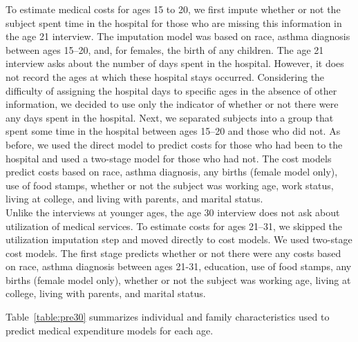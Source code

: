 \noindent To estimate medical costs for ages 15 to 20, we first impute whether or not the subject spent time in the hospital for those who are missing this information in the age 21 interview.  The imputation model was based on race, asthma diagnosis between ages 15--20, and, for females, the birth of any children.  The age 21 interview asks about the number of days spent in the hospital.  However, it does not record the ages at which these hospital stays occurred.  Considering the difficulty of assigning the hospital days to specific ages in the absence of other information, we decided to use only the indicator of whether or not there were any days spent in the hospital.  Next, we separated subjects into a group that spent some time in the hospital between ages 15--20 and those who did not.  As before, we used the direct model to predict costs for those who had been to the hospital and used a two-stage model for those who had not.  The cost models predict costs based on race, asthma diagnosis, any births (female model only), use of food stamps, whether or not the subject was working age, work status, living at college, and living with parents, and marital status.\\

\noindent Unlike the interviews at younger ages, the age 30 interview does not ask about utilization of medical services.  To estimate costs for ages 21--31, we skipped the utilization imputation step and moved directly to cost models. We used two-stage cost models.  The first stage predicts whether or not there were any costs based on race, asthma diagnosis between ages 21-31, education, use of food stamps, any births (female model only), whether or not the subject was working age, living at college, living with parents, and marital status.

\noindent Table~\ref{table:pre30} summarizes individual and family characteristics used to predict medical expenditure models for each age.

